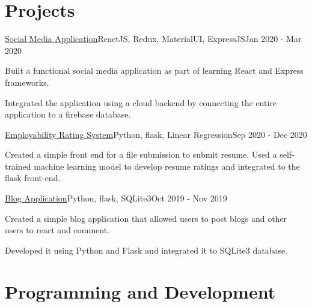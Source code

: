 \documentclass[letterpaper]{resume_config}
\begin{document}
\section{Projects}
\Project
    {\href{https://github.com/yk-2310/Social-app}{Social Media Application}}{ReactJS, Redux, MaterialUI, ExpressJS}{Jan 2020 - Mar 2020}
    {
        \item {Built a functional social media application as part of learning React and Express frameworks.}
        \item {Integrated the application using a cloud backend by connecting the entire application to a firebase database.}
    }
\Project
    {\href{https://github.com/yk-2310/Employability-Rating-System-using-Flask}{Employability Rating System}}{Python, flask, Linear Regression}{Sep 2020 - Dec 2020}
    {
        \item {Created a simple front end for a file submission to submit resume. Used a self-trained machine learning model to develop resume ratings and integrated to the flask front-end.}
    }
\Project
    {\href{https://github.com/yk-2310/Blog-Application}{Blog Application}}{Python, flask, SQLite3}{Oct 2019 - Nov 2019}
    {
        \item {Created a simple blog application that allowed users to post blogs and other users to react and comment.}
        \item {Developed it using Python and Flask and integrated it to SQLite3 database.}
    }
\vspace{-5pt}
\section{Programming and Development}
\begin{URLList}[3][3]
    \item{}
    \item{}
    \item{}
\end{URLList}
\end{document}
